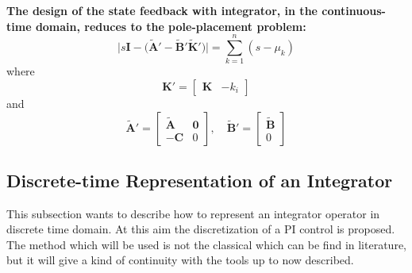 \documentclass[12pt,a4paper,oneside]{book}
\begin{document}
\begin{onehalfspace}
\vspace{5mm}
\begin{mybox}
	\textbf{The design of the state feedback with integrator, in the 
		continuous-time domain, reduces to the pole-placement problem:} 
	\begin{equation}\label{eq_servo_ct_14a}
		\Bigg|s\mathbf{I}-\Big(\tilde{\mathbf{A}}' - 
		\tilde{\mathbf{B}}'\tilde{\mathbf{K}}'\Big)\Bigg|=\sum_{k=1}^{n}(s-\mu_k)
	\end{equation}
	where
	\begin{equation}\label{eq_servo_ct_14b}
		{\mathbf{K}}'= \begin{bmatrix}
			{\mathbf{K}} & -k_i
		\end{bmatrix}
	\end{equation}
	and
	\begin{equation}\label{eq_servo_ct_15}
		\tilde{\mathbf{A}}'  = 
		\begin{bmatrix}
			\tilde{\mathbf{A}} & \mathbf{0} \\[6pt]
			-{\mathbf{C}} & 0
		\end{bmatrix}, \quad
		\tilde{\mathbf{B}}'  = 
		\begin{bmatrix}
			\tilde{\mathbf{B}} \\[6pt] 0
		\end{bmatrix}
	\end{equation}
\end{mybox}

\subsection{Discrete-time Representation of an Integrator}
This subsection wants to describe how to represent an integrator operator in 
discrete time domain. At this aim the discretization of a PI control is 
proposed. The method which will be used is not the classical which can be find 
in literature, but it will give a kind of continuity with the tools up to now 
described.


\end{onehalfspace}
\end{document}
